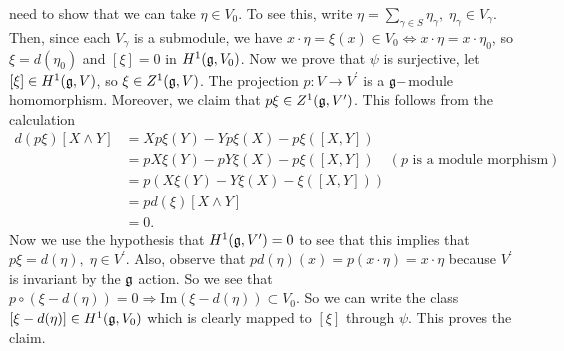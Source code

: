 \begin{itemize}
need to show that we can take $\eta\in V_0$. 
To see this, write $\eta=\sum_{\gamma\in S}\eta_{\gamma},\;\eta_{\gamma}\in V_{\gamma}$. Then, since each $V_{\gamma}$ is a 
submodule, we have $x\cdot\eta =\xi(x)\in V_0\iff x\cdot\eta=x\cdot \eta_0$, so $\xi=d(\eta_0)$ and $[\xi]=0$ in 
$H^1(\mathfrak{g},V_0)$. Now we prove that $\psi$ is surjective, let $[\xi]\in H^1(\mathfrak{g},V)$, so 
$\xi\in Z^1(\mathfrak{g},V)$. The projection $p:V\to V^\prime$ is a $\mathfrak{g}-$module homomorphism. Moreover, we claim that 
$p\xi\in Z^1(\mathfrak{g},V^\prime)$. This follows from the calculation 
\begin{equation}
    \begin{split}
        d(p\xi)[X\wedge Y]&=Xp\xi(Y)-Yp\xi(X)-p\xi([X,Y])\\
        &=pX\xi(Y)-pY\xi(X)-p\xi([X,Y])\quad(p \text{ is a module morphism})\\
        &=p(X\xi(Y)-Y\xi(X)-\xi([X,Y]))\\
        &=pd(\xi)[X\wedge Y]\\
        &=0.
    \end{split}
\end{equation}
Now we use the hypothesis that $H^1(\mathfrak{g},V^\prime)=0$ to see that this implies that $p\xi=d(\eta),\;\eta\in V^\prime$. 
Also, observe that $pd(\eta)(x)=p(x\cdot \eta)=x\cdot \eta$ because $V^\prime$ is invariant by the $\mathfrak{g}$ action. So 
we see that $p\circ (\xi-d(\eta))=0\Rightarrow \text{Im}(\xi-d(\eta))\subset V_0$. So we can write the class 
$[\xi-d(\eta)]\in H^1(\mathfrak{g},V_0)$ which is clearly mapped to $[\xi]$ through $\psi$. This proves the claim.


\end{itemize}
